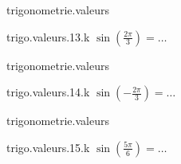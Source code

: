 \begin{qcm}{trigonometrie.valeurs}
    \begin{question}{trigo.valeurs.13.k}
         \({\sin\left(\frac{2\pi}{3}\right)}=\ldots\)
         \vspace{-1.5ex}
         \begin{multicols}{3}
            \begin{reponses}
                \lastchoices
            \end{reponses}
        \end{multicols}
    \end{question}
\end{qcm}

\begin{qcm}{trigonometrie.valeurs}
    \begin{question}{trigo.valeurs.14.k}
         \({\sin\left(-\frac{2\pi}{3}\right)}=\ldots\)
         \vspace{-1.5ex}
         \begin{multicols}{3}
            \begin{reponses}
                \lastchoices
            \end{reponses}
        \end{multicols}
    \end{question}
\end{qcm}

\begin{qcm}{trigonometrie.valeurs}
    \begin{question}{trigo.valeurs.15.k}
         \({\sin\left(\frac{5\pi}{6}\right)}=\ldots\)
         \vspace{-1.5ex}
         \begin{multicols}{3}
            \begin{reponses}
                \lastchoices
            \end{reponses}
        \end{multicols}
    \end{question}
\end{qcm}

